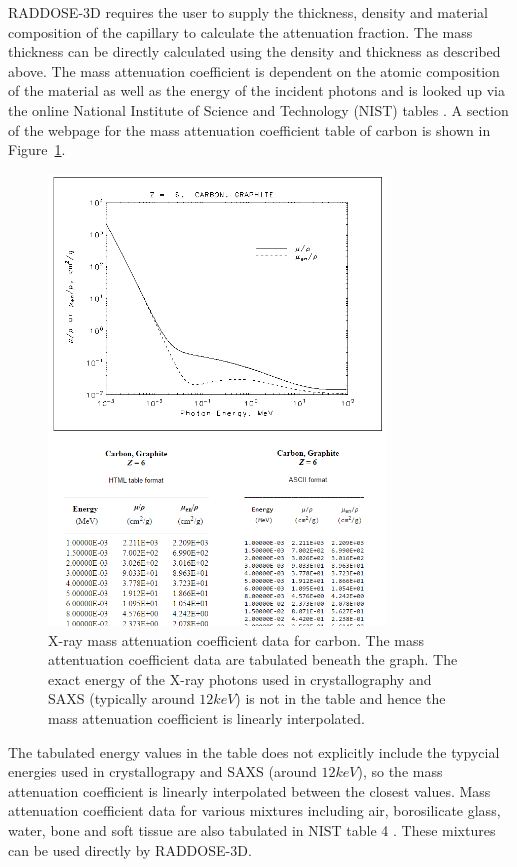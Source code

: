 RADDOSE-3D requires the user to supply the thickness, density and material composition of the capillary to calculate the attenuation fraction.
The mass thickness can be directly calculated using the density and thickness as described above.
The mass attenuation coefficient is dependent on the atomic composition of the material as well as the energy of the incident photons and is looked up via the online National Institute of Science and Technology (NIST) tables \cite{nisttable3,nisttable4}.
A section of the webpage for the mass attenuation coefficient table of carbon is shown in Figure~\ref{fig:NIST table for carbon}.
\begin{figure}
    \centering
    \includegraphics[width=0.8\textwidth]{figures/saxs/nist_table_carbon.png}
    \caption{X-ray mass attenuation coefficient data for carbon. The mass attentuation coefficient data are tabulated beneath the graph. The exact energy of the X-ray photons used in crystallography and SAXS (typically around $12 keV$) is not in the table and hence the mass attenuation coefficient is linearly interpolated.}
    \label{fig:NIST table for carbon}
\end{figure}
The tabulated energy values in the table does not explicitly include the typycial energies used in crystallograpy and SAXS (around $12 keV$), so the mass attenuation coefficient is linearly interpolated between the closest values.
Mass attenuation coefficient data for various mixtures including air, borosilicate glass, water, bone and soft tissue are also tabulated in NIST table 4 \cite{nisttable4}.
These mixtures can be used directly by RADDOSE-3D.

